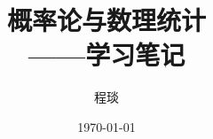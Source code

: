 \documentclass[10.5pt,a4paper]{ctexbook} %
\begin{document}
\title{{\Huge{\textbf{概率论与数理统计}}}\\——学习笔记}
\author{程琰}
\date{\today}
\maketitle






\newpage
{}
\setcounter{page}{1}
\tableofcontents


\newpage
\setcounter{page}{1}









\end{document}
